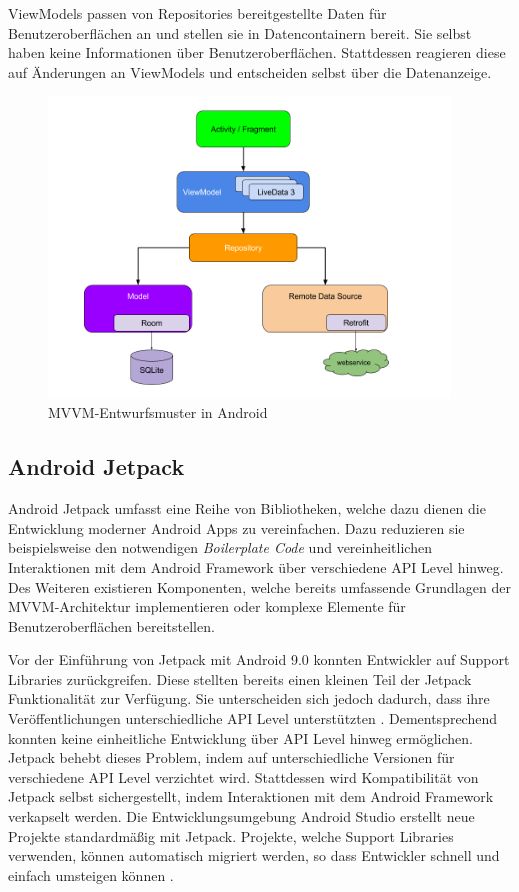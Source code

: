 ViewModels passen von Repositories bereitgestellte Daten für Benutzeroberflächen an und stellen sie in Datencontainern bereit.
Sie selbst haben keine Informationen über Benutzeroberflächen.
Stattdessen reagieren diese auf Änderungen an ViewModels und entscheiden selbst über die Datenanzeige.

\begin{figure}
	\centering
	\includegraphics[height=8cm,keepaspectratio]{./img/android-architecture.png}
	\caption{MVVM-Entwurfsmuster in Android \autocite{androidarchitecture}}
	\label{fig:app:architecture:mvvm}
\end{figure}

\subsection{Android Jetpack}
\label{subsec:app:jetpack}
Android Jetpack umfasst eine Reihe von Bibliotheken, welche dazu dienen die Entwicklung moderner Android Apps zu vereinfachen.
Dazu reduzieren sie beispielsweise den notwendigen \textit{Boilerplate Code} und vereinheitlichen Interaktionen mit dem Android Framework über verschiedene API Level hinweg.
Des Weiteren existieren Komponenten, welche bereits umfassende Grundlagen der MVVM-Architektur implementieren oder komplexe Elemente für Benutzeroberflächen bereitstellen.

Vor der Einführung von Jetpack mit Android 9.0 konnten Entwickler auf Support Libraries zurückgreifen.
Diese stellten bereits einen kleinen Teil der Jetpack Funktionalität zur Verfügung.
Sie unterscheiden sich jedoch dadurch, dass ihre Veröffentlichungen unterschiedliche API Level unterstützten \autocite{supportlibrariesversions}.
Dementsprechend konnten keine einheitliche Entwicklung über API Level hinweg ermöglichen.
Jetpack behebt dieses Problem, indem auf unterschiedliche Versionen für verschiedene API Level verzichtet wird.
Stattdessen wird Kompatibilität von Jetpack selbst sichergestellt, indem Interaktionen mit dem Android Framework verkapselt werden.
Die Entwicklungsumgebung Android Studio erstellt neue Projekte standardmäßig mit Jetpack.
Projekte, welche Support Libraries verwenden, können automatisch migriert werden, so dass Entwickler schnell und einfach umsteigen können \autocite{androidxmigration}.

